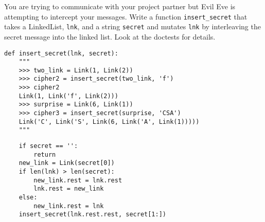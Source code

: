 \question
You are trying to communicate with your project partner but Evil Eve
is attempting to intercept your messages.
Write a function \texttt{insert\_secret} that takes a LinkedList,
\texttt{lnk}, and a string \texttt{secret} and mutates \texttt{lnk}
by interleaving the secret message into the linked list. Look at
the doctests for details.

\begin{lstlisting}
def insert_secret(lnk, secret):
    """
    >>> two_link = Link(1, Link(2))
    >>> cipher2 = insert_secret(two_link, 'f')
    >>> cipher2
    Link(1, Link('f', Link(2)))
    >>> surprise = Link(6, Link(1))
    >>> cipher3 = insert_secret(surprise, 'CSA')
    Link('C', Link('S', Link(6, Link('A', Link(1)))))
    """
\end{lstlisting}
\begin{solution}[1in]
\begin{lstlisting}
    if secret == '':
    	return
    new_link = Link(secret[0])
    if len(lnk) > len(secret):
    	new_link.rest = lnk.rest
    	lnk.rest = new_link
    else:
    	new_link.rest = lnk
    insert_secret(lnk.rest.rest, secret[1:])
\end{lstlisting}
\end{solution}
